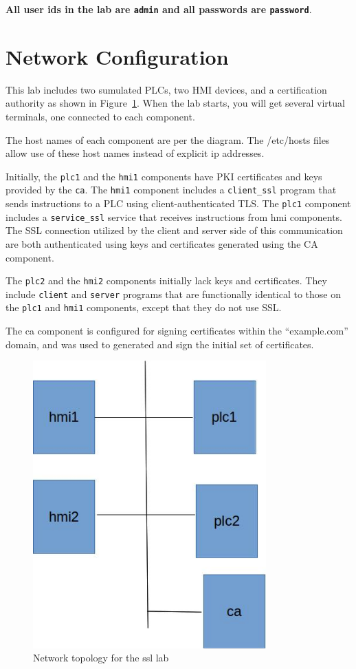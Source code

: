 \textbf{All user ids in the lab are {\tt admin} and all passwords are {\tt password}}.

\section{Network Configuration}
This lab includes two sumulated PLCs, two HMI devices, and a certification
authority as shown in Figure~\ref{fig:topology}.
When the lab starts, you will get several virtual terminals, one connected to each
component.

The host names of each component are per the diagram.  The /etc/hosts files
allow use of these host names instead of explicit ip addresses.

Initially, the {\tt plc1} and the {\tt hmi1} components have PKI certificates
and keys provided by the {\tt ca}.  The {\tt hmi1} component includes a 
{\tt client\_ssl} program that sends instructions to a PLC using client-authenticated
TLS.  The {\tt plc1} component includes a {\tt service\_ssl} service that receives
instructions from hmi components.  The SSL connection utilized by the client and server
side of this communication are both authenticated using keys and certificates 
generated using the CA component.

The {\tt plc2} and the {\tt hmi2} components initially lack keys and certificates.  They
include {\tt client} and {\tt server} programs that are functionally identical to those on the
{\tt plc1} and {\tt hmi1} components, except that they do not use SSL.

The ca component is configured for signing certificates within the ``example.com'' domain,
and was used to generated and sign the initial set of certificates.

\begin{figure}[H]
\begin{center}
\includegraphics [width=0.8\textwidth]{ssl.jpg}
\end{center}
\caption{Network topology for the ssl lab}
\label{fig:topology}
\end{figure}


